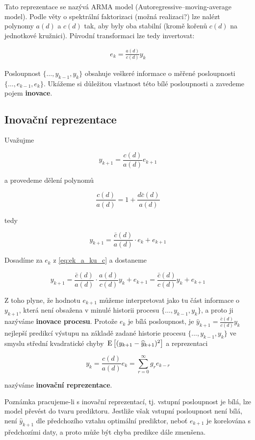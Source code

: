 Tato reprezentace se nazývá ARMA model (Autoregressive–moving-average model). Podle věty o spektrální faktorizaci (možná realizaci?) lze nalézt polynomy $a(d)$ a $c(d)$ tak, aby byly oba stabilní (kromě kořenů $c(d)$ na jednotkové kružnici). Původní transformaci lze tedy invertovat:

\begin{align} \label{eq:ek_a_ku_c}
  e_k=\frac{a(d)}{c(d)}y_k
\end{align}



Posloupnost $\{\ldots, y_{k-1}, y_k \}$ obsahuje veškeré informace o měřené posloupnosti $\{ \ldots, e_{k-1},e_k \}$. Ukážeme si důležitou vlastnost této bílé posloupnosti a zavedeme pojem \textbf{inovace}.

\subsection{Inovační reprezentace}
Uvažujme

\[ y_{k+1}=\frac{c(d)}{a(d)}e_{k+1} \]

a provedeme dělení polynomů

\[ \frac{c(d)}{a(d)} = 1+\frac{d\bar{c}(d)}{a(d)} \]

tedy

\[ y_{k+1} = \frac{\bar{c}(d)}{a(d)}\cdot e_k+e_{k+1} \]

Dosadíme za $e_k$ z \eqref{eq:ek_a_ku_c} a dostaneme

\[ y_{k+1} = \frac{\bar{c}(d)}{a(d)}\cdot\frac{a(d)}{c(d)}y_k+e_{k+1}=\frac{\bar{c}(d)}{c(d)}y_k+e_{k+1} \]

Z toho plyne, že hodnotu $e_{k+1}$ můžeme interpretovat jako tu část informace o $y_{k+1}$, která není obsažena v minulé historii procesu $\{ \ldots,y_{k-1},y_k \}$, a proto ji nazýváme \textbf{inovace procesu}. Protože $e_k$ je bílá posloupnost, je $\widehat{y}_{k+1}=\frac{\bar{c}(d)}{c(d)}y_k$ nejlepší predikcí výstupu na základě zadané historie procesu $\{ \ldots, y_{k-1},y_k \}$ ve smyslu střední kvadratické chyby $\,\mathrm{E}\left[( y_{k+1}-\widehat{y}_{k+1})^2\right]$ a reprezentaci

\[ y_k = \frac{c(d)}{a(d)}e_k = \sum_{r=0}^\infty g_r e_{k-r} \]

nazýváme \textbf{inovační reprezentace}.

\begin{note}{Poznámka}
pracujeme-li s inovační reprezentací, tj. vstupní posloupnost je bílá, lze model převést do tvaru prediktoru. Jestliže však vstupní posloupnost není bílá, není $\widehat{y}_{k+1}$ dle předchozího vztahu optimální prediktor, neboť $e_{k+1}$ je korelována s předchozími daty, a proto může být chyba predikce dále zmenšena.
\end{note}

